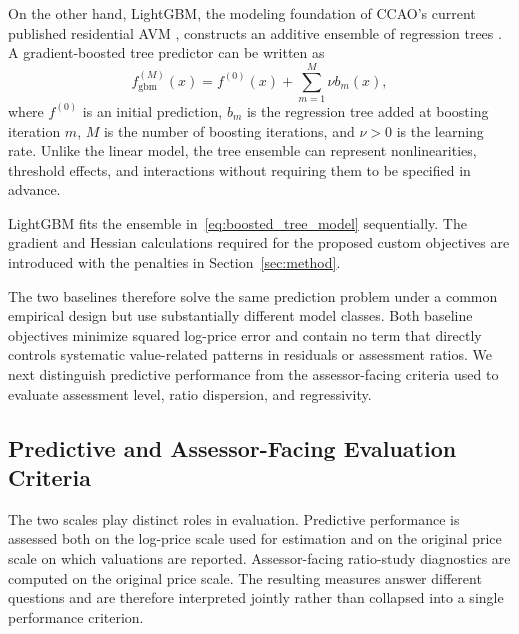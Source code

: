 \documentclass[10pt]{article}
\theoremstyle{definition}
\newcommand{\1}{\mathbf{1}}
\begin{document}
{On the other hand, LightGBM, the modeling foundation of CCAO's current published residential AVM , constructs an additive ensemble of regression trees \cite{CCAOModelResAVM2026,lightgbm}. A gradient-boosted tree predictor can be written as}
\begin{equation}
\label{eq:boosted_tree_model}
f_{\mathrm{gbm}}^{(M)}(x)
=
f^{(0)}(x)
+
\sum_{m=1}^{M}\nu b_m(x),
\end{equation}
where $f^{(0)}$ is an initial prediction, $b_m$ is the regression tree added at boosting iteration $m$, $M$ is the number of boosting iterations, and $\nu>0$ is the learning rate. Unlike the linear model, the tree ensemble can represent nonlinearities, threshold effects, and interactions without requiring them to be specified in advance.

LightGBM fits the ensemble in~\eqref{eq:boosted_tree_model} sequentially. The gradient and Hessian calculations required for the proposed custom objectives are introduced with the penalties in Section~\ref{sec:method}.

The two baselines therefore solve the same prediction problem under a common empirical design but use substantially different model classes. Both baseline objectives minimize squared log-price error and contain no term that directly controls systematic value-related patterns in residuals or assessment ratios. We next distinguish predictive performance from the assessor-facing criteria used to evaluate assessment level, ratio dispersion, and regressivity.


\subsection{Predictive and Assessor-Facing Evaluation Criteria}
\label{subsec:metrics}


{The two scales play distinct roles in evaluation. Predictive performance is assessed both on the log-price scale used for estimation and on the original price scale on which valuations are reported. Assessor-facing ratio-study diagnostics are computed on the original price scale. The resulting measures answer different questions and are therefore interpreted jointly rather than collapsed into a single performance criterion.}
\end{document}
